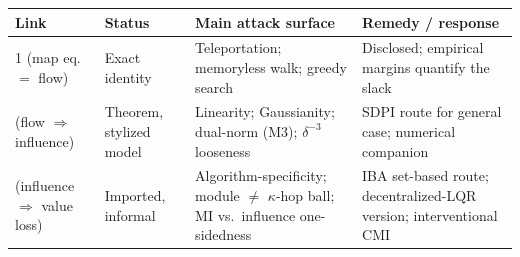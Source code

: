 \documentclass[11pt]{article}
\theoremstyle{definition}
\theoremstyle{remark}
\begin{document}
\begin{center}
    \small
    \begin{tabular}{p{2.6cm} p{3.4cm} p{4.2cm} p{3.6cm}}
        \toprule
        Link & Status                                           & Main attack surface
             & Remedy / response                                                      \\
        \midrule
        1 (map eq.\ $=$ flow)
             & Exact identity                                   &
        Teleportation; memoryless walk; greedy search
             & Disclosed; empirical margins quantify the slack                        \\
        \addlinespace
        2 (flow $\Rightarrow$ influence)
             & Theorem, stylized model                          &
        Linearity; Gaussianity; dual-norm (M3); $\delta^{-3}$ looseness
             & SDPI route for general case; numerical companion                       \\
        \addlinespace
        3 (influence $\Rightarrow$ value loss)
             & Imported, informal                               &
        Algorithm-specificity; module $\neq$ $\kappa$-hop ball; MI vs.\
        influence one-sidedness
             & IBA set-based route; decentralized-LQR version;
        interventional CMI                                                            \\
        \bottomrule
    \end{tabular}
\end{center}
\end{document}
